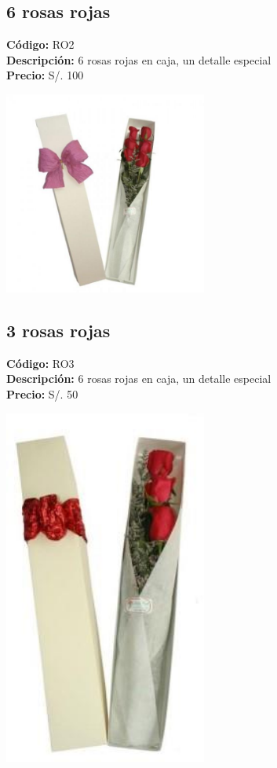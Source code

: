 \subsection*{6 rosas rojas}
\textbf{Código:} RO2 \\
\textbf{Descripción:} 6 rosas rojas en caja, un detalle especial \\
\textbf{Precio:} S/. 100 \\
\begin{center}
\includegraphics[width=0.5\textwidth]{imagenes_extraidas/image_5_4}
\end{center}
\subsection*{3 rosas rojas}
\textbf{Código:} RO3 \\
\textbf{Descripción:} 6 rosas rojas en caja, un detalle especial \\
\textbf{Precio:} S/. 50 \\
\begin{center}
\includegraphics[width=0.5\textwidth]{imagenes_extraidas/image_5_5}
\end{center}

